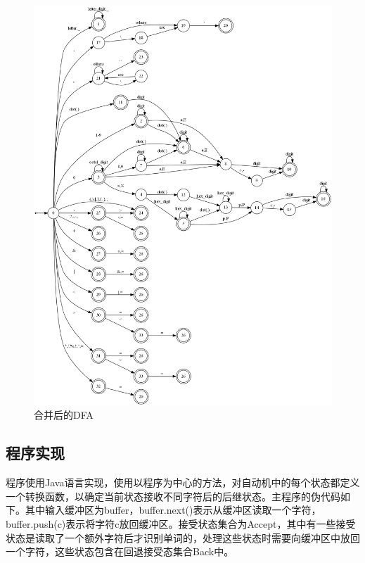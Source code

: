 \documentclass[UTF8, twoside, titlepage]{ctexart}
\begin{document}
\begin{figure}[htbp]
	\centering
	\includegraphics[width=\textwidth]{images/dfa.png}
	\caption{合并后的DFA}
	\label{fig:dfa}
\end{figure}

\subsection{程序实现}
程序使用Java语言实现，使用以程序为中心的方法，对自动机中的每个状态都定义一个转换函数，以确定当前状态接收不同字符后的后继状态。主程序的伪代码如下。其中输入缓冲区为buffer，buffer.next()表示从缓冲区读取一个字符，buffer.push(c)表示将字符c放回缓冲区。接受状态集合为Accept，其中有一些接受状态是读取了一个额外字符后才识别单词的，处理这些状态时需要向缓冲区中放回一个字符，这些状态包含在回退接受态集合Back中。
\end{document}
